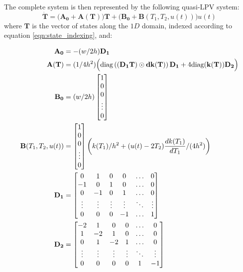 

The complete system is then represented by the following quasi-LPV system:
\begin{equation}
    \mathbf{\dot{T}} = \bigl (\mathbf{A_0} +\mathbf{A}(\mathbf{T})\bigr)\mathbf{T} + \bigl(\mathbf{B_0}+ \mathbf{B}(T_1,T_2,u(t))\bigr)u(t)
\end{equation}
where $\mathbf{T}$ is the vector of states along the $1D$ domain, indexed according to equation \eqref{eqn:state_indexing}, and:
\begin{footnotesize}
\begin{align}
 \mathbf{A_0} &=
 -(w/2h)\mathbf{D_1}\\
 \mathbf{A}(\mathbf{T}) &= (1/4h^2)
 \Bigl (\text{diag}\left((\mathbf{D_1}\mathbf{T})\odot \mathbf{dk}(\mathbf{T})\right)\mathbf{D_1} +4\text{diag}(\mathbf{k}(\mathbf{T}))\mathbf{D_2}\Bigr)\\
 \mathbf{B_0} &=(w/2h)
 \begin{bmatrix}
     1\\
     0\\
     0\\
     \vdots\\
     0
 \end{bmatrix} \\
 \mathbf{B}(T_1,T_2,u(t)) &=
 \begin{bmatrix}
     1\\
     0\\
     0\\
     \vdots\\
     0
 \end{bmatrix}\left (k(T_1)/h^2 + ( u(t) - 2T_2)\frac{d k(T_1) }{d T_1}/(4h^2)\right)\\
 \mathbf{D_1} &=
 \begin{bmatrix}
     0 & 1 & 0 & 0 & \hdots & 0\\
     -1 & 0 & 1 & 0 & \hdots & 0\\
     0 & -1 & 0 & 1 & \hdots & 0\\
     \vdots & \vdots & \vdots & \vdots & \ddots & \vdots\\
     0 & 0 & 0 & -1 & \hdots & 1
 \end{bmatrix}\\
 \mathbf{D_2} &=
 \begin{bmatrix}
     -2 & 1 & 0 & 0 & \hdots & 0\\
     1 & - 2 & 1 & 0 & \hdots & 0\\
     0 & 1 & - 2 & 1 & \hdots & 0\\
     \vdots & \vdots & \vdots & \vdots & \ddots & \vdots \\
     0 & 0 & 0 & 0 & 1 & -1
 \end{bmatrix}
\end{align}
\end{footnotesize} 

